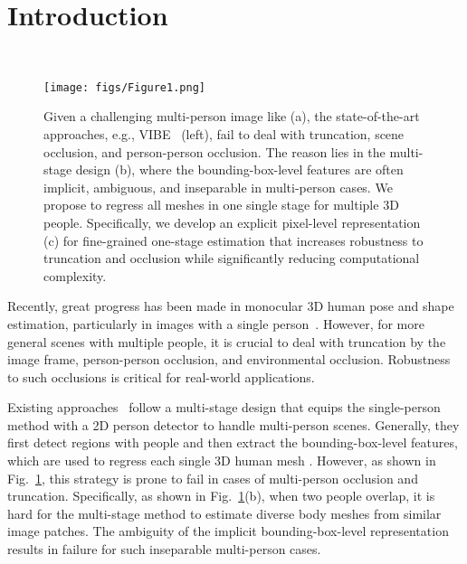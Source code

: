 \documentclass[10pt,twocolumn,letterpaper]{article}
\begin{document}
\section{Introduction}~\label{sec:intro}
\vspace{-5mm}

\begin{figure}[t]
	\centering
	\texttt{[image: figs/Figure1.png]} \caption{
    Given a challenging multi-person image like (a), the state-of-the-art approaches, e.g., VIBE~\cite{kocabas2020vibe} (left), fail to deal with truncation, scene occlusion, and person-person occlusion. 
 The reason lies in the multi-stage design (b), where the bounding-box-level features are often implicit, ambiguous, and inseparable in multi-person cases.
 We propose to regress all meshes in one single stage for multiple 3D people.
Specifically, we develop an explicit pixel-level representation (c) for fine-grained one-stage estimation that increases robustness to truncation and occlusion while significantly reducing computational complexity.
}
	\label{fig:motivation}
\end{figure}

Recently, great progress has been made in monocular 3D human pose and shape estimation, particularly in images with a single person~\cite{hmr,kocabas2020vibe,kolotouros2019spin,surreal,Xu_2019_ICCV}.
However, for more general scenes with multiple people, it is crucial to deal with truncation by the image frame, person-person occlusion, and environmental occlusion. 
Robustness to such occlusions is critical for real-world applications.

Existing approaches~\cite{jiang2020coherent,kocabas2020vibe,zanfir2018monocular,zanfir2018deep} follow a multi-stage design that equips the single-person method with a 2D person detector to handle multi-person scenes.
Generally, they first detect regions with people and then extract the bounding-box-level features, which are used to regress each single 3D human mesh \cite{Guler_2019_CVPR,hmr,kanazawa2019learning,kocabas2020vibe,kolotouros2019spin,gcmr,pavlakos2019texturepose,sun2019dsd-satn,Xu_2019_ICCV,Zhu_2019_CVPR}. 
However, as shown in Fig.~\ref{fig:motivation}, this strategy is prone to fail in cases of multi-person occlusion and truncation. 
Specifically, as shown in Fig.~\ref{fig:motivation}(b), when two people overlap, it is hard for the multi-stage method to estimate diverse body meshes from similar image patches.
The ambiguity of the implicit bounding-box-level representation results in failure for such inseparable multi-person cases. 
\end{document}
